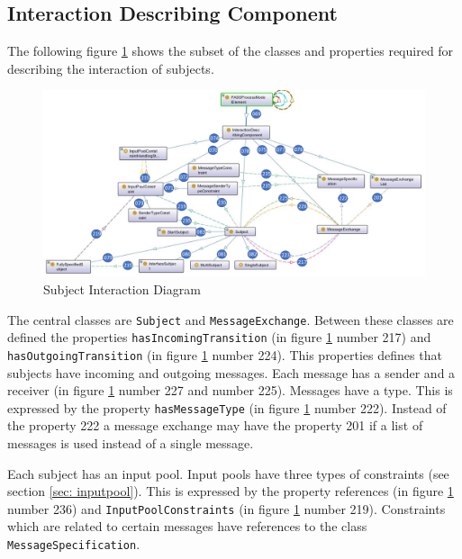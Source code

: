 \subsection{Interaction Describing Component}

The following figure \ref{fig:ontogrsubjectinteraction} shows the subset of the classes and properties required for describing the interaction of subjects. 

\begin{figure}[htbp]
	\centering
	\includegraphics[width=1.0\linewidth]{20181026-Ontologie-Bilder/Grafiken-Ontologie/SUbject-Interaction/OntoGrSubjectInteraction}
	\caption[Subject Interaction Diagram]{Subject Interaction Diagram}
	\label{fig:ontogrsubjectinteraction}
\end{figure}

The central classes are \texttt{Subject} and \texttt{MessageExchange}. Between these classes are defined the properties \texttt{hasIncomingTransition} (in figure \ref{fig:ontogrsubjectinteraction} number 217) and \texttt{hasOutgoingTransition} (in figure \ref{fig:ontogrsubjectinteraction} number 224). This properties defines that subjects have incoming and outgoing messages. Each message has a sender and a receiver (in figure \ref{fig:ontogrsubjectinteraction} number 227 and number 225). Messages have a type. This is expressed by the property \texttt{hasMessageType} (in figure \ref{fig:ontogrsubjectinteraction} number 222). Instead of the property 222 a message exchange may have the property 201 if a list of messages is used instead of a single message.

Each subject has an input pool. Input pools have three types of constraints (see section \ref{sec: inputpool}). This is expressed by the property references  (in figure \ref{fig:ontogrsubjectinteraction} number 236) and \texttt{InputPoolConstraints} (in figure \ref{fig:ontogrsubjectinteraction} number 219). Constraints which are related to certain messages have references to the class \texttt{MessageSpecification}.

